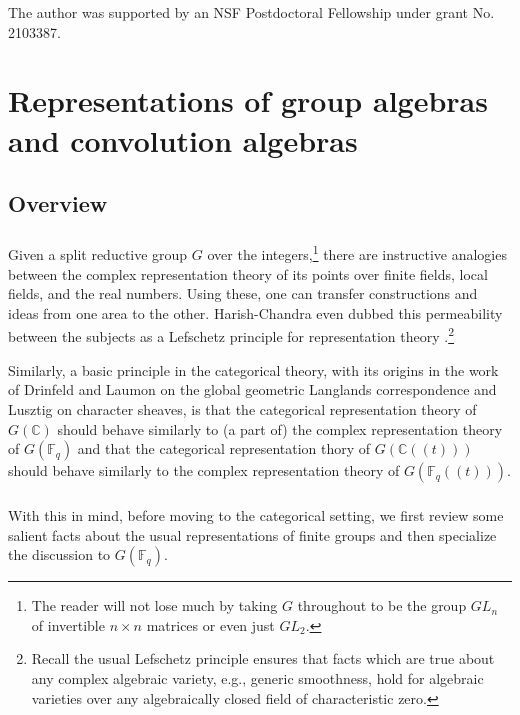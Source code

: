\documentclass[10pt]{amsart}
\theoremstyle{remark}
\numberwithin{equation}{section}
\begin{document}
	The author was supported by an NSF Postdoctoral Fellowship under grant No. 
	2103387. 
	
	
	
	
	\section{Representations of group algebras and convolution algebras} 
	\label{s:repthryfingroup}
	\subsection{Overview} 
	
	\subsubsection{} Given a split reductive group $G$ over the 
	integers,\footnote{The reader will not lose much by taking $G$ throughout to 
	be the group $GL_n$ of invertible $n \times n$ matrices or even just 
	$GL_2$.} there are instructive analogies between the complex 
	representation theory of its points over finite fields, local fields, and 
	the real numbers. Using these, one can transfer constructions and ideas 
	from one area to the other. Harish-Chandra even dubbed this 
	permeability between the subjects as a Lefschetz principle for 
	representation theory \cite{langlands1985harish}.\footnote{Recall the usual Lefschetz principle 
	ensures that facts which are true about any complex algebraic variety, e.g., 
	generic smoothness, hold for algebraic varieties over any algebraically 
	closed field of characteristic zero.}  
	
	
	Similarly, a basic principle in the categorical theory, with its origins in 
	the work of Drinfeld and Laumon on the global geometric Langlands 
	correspondence and Lusztig on character sheaves, is that the categorical 
	representation theory of $G(\mathbb{C})$ should behave similarly to (a part 
	of) the complex representation theory of $G(\mathbb{F}_q)$ and that the 
	categorical representation thory of $G(\mathbb{C}(\!(t)\!))$ should behave 
	similarly to the complex representation theory of 
	$G(\mathbb{F}_q(\!(t)\!))$. 
	
	
	\subsubsection{} With this in mind, before moving to the categorical 
	setting, we first review some salient facts about the usual representations 
	of finite groups and then specialize the discussion to $G(\mathbb{F}_q)$. 
	
\end{document}
